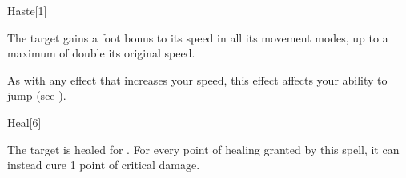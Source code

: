 \begin{spellsection}{Haste}[1]
    \begin{spellheader}
    \end{spellheader}
    \begin{spellcontent}
        \begin{spelltargetinginfo}
        \end{spelltargetinginfo}
        \begin{spelleffects}
            \spelleffect The target gains a  foot bonus to its speed in all its movement modes, up to a maximum of double its original speed.
            \spelldur \durshort \dismissable
        \end{spelleffects}
    \end{spellcontent}
    \begin{spellfooter}
        \spellnotes As with any effect that increases your speed, this effect affects your ability to jump (see ).
        \miscastrandom
    \end{spellfooter}
    \begin{spellaugments}
    \end{spellaugments}
\end{spellsection}

\begin{spellsection}{Heal}[6]
    \begin{spellheader}
    \end{spellheader}
    \begin{spellcontent}
        \begin{spelltargetinginfo}
        \end{spelltargetinginfo}
        \begin{spelleffects}
            \spelleffect The target is healed for \spelldamage{}.
            For every point of healing granted by this spell, it can instead cure 1 point of critical damage.
        \end{spelleffects}
    \end{spellcontent}
    \begin{spellfooter}
        \miscastrandom
    \end{spellfooter}
    \begin{spellaugments}
    \end{spellaugments}
\end{spellsection}

